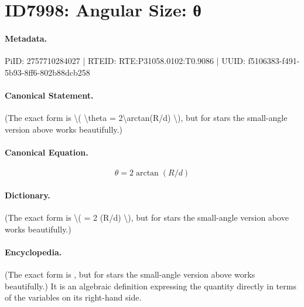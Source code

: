 \section*{ID7998: Angular Size: θ}
\paragraph{Metadata.}
PiID: 2757710284027 | RTEID: RTE:P31058.0102:T0.9086 | UUID: f5106383-f491-5b93-8ff6-802b88dcb258

\paragraph{Canonical Statement.}
(The exact form is \textbackslash{}( \textbackslash{}theta = 2\textbackslash{}arctan(R/d) \textbackslash{}), but for stars the small-angle version above works beautifully.)

\paragraph{Canonical Equation.}
\[
\theta = 2\arctan(R/d)
\]

\paragraph{Dictionary.}
(The exact form is \textbackslash{}( = 2 (R/d) \textbackslash{}), but for stars the small-angle version above works beautifully.)

\paragraph{Encyclopedia.}
(The exact form is , but for stars the small-angle version above works beautifully.) It is an algebraic definition expressing the quantity directly in terms of the variables on its right-hand side.
